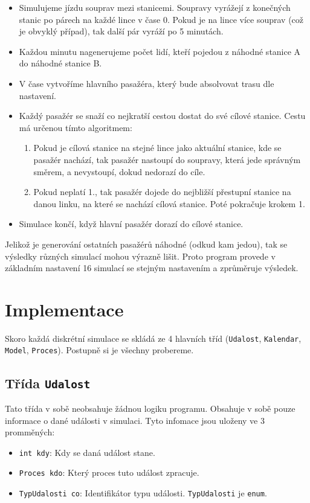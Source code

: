 \documentclass[12pt, a4paper]{article}
\begin{document}
\begin{itemize}
    \item Simulujeme jízdu souprav mezi stanicemi. Soupravy vyrážejí z konečných stanic po párech na každé lince v čase 0. Pokud je na lince více souprav (což je obvyklý případ), tak další pár vyráží po 5 minutách.
    \item Každou minutu nagenerujeme  počet lidí, kteří pojedou z náhodné stanice A do náhodné stanice B.
    \item V čase  vytvoříme hlavního pasažéra, který bude absolvovat trasu dle nastavení.
    \item Každý pasažér se snaží co nejkratší cestou dostat do své cílové stanice. Cestu má určenou tímto algoritmem:
        \begin{enumerate}
            \item Pokud je cílová stanice na stejné lince jako aktuální stanice, kde se pasažér nachází, tak pasažér nastoupí do soupravy, která jede správným směrem, a nevystoupí, dokud nedorazí do cíle.
            \item Pokud neplatí 1., tak pasažér dojede do nejbližší přestupní stanice na danou linku, na které se nachází cílová stanice. Poté pokračuje krokem 1.
        \end{enumerate} 
    \item Simulace končí, když hlavní pasažér dorazí do cílové stanice.
\end{itemize}

Jelikož je generování ostatních pasažérů náhodné (odkud kam jedou), tak se výsledky různých simulací mohou výrazně lišit. Proto program provede v základním nastavení 16 simulací se stejným nastavením a zprůměruje výsledek.

\section{Implementace}

Skoro každá diskrétní simulace se skládá ze 4 hlavních tříd (\texttt{Udalost}, \texttt{Kalendar}, \texttt{Model}, \texttt{Proces}). Postupně si je všechny probereme. 

\subsection{Třída \texttt{Udalost}}
Tato třída v sobě neobsahuje žádnou logiku programu. Obsahuje v sobě pouze informace o dané události v simulaci. Tyto infomace jsou uloženy ve 3 promměných:
\begin{itemize}
    \item \texttt{int kdy}: Kdy se daná událost stane.
    \item \texttt{Proces kdo}: Který proces tuto událost zpracuje.
    \item \texttt{TypUdalosti co}: Identifikátor typu události. \texttt{TypUdalosti} je \texttt{enum}.
\end{itemize}
\end{document}
